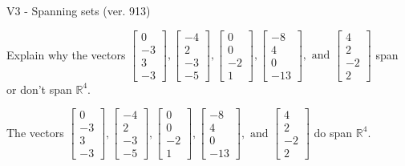 \begin{exercise}
  \begin{exerciseTitle}V3 - Spanning sets (ver. 913)\end{exerciseTitle}
  \begin{exerciseStatement}
    Explain why the vectors \(\left[\begin{array}{r}
0 \\
-3 \\
3 \\
-3
\end{array}\right] , \left[\begin{array}{r}
-4 \\
2 \\
-3 \\
-5
\end{array}\right] , \left[\begin{array}{r}
0 \\
0 \\
-2 \\
1
\end{array}\right] , \left[\begin{array}{r}
-8 \\
4 \\
0 \\
-13
\end{array}\right] , \text{ and } \left[\begin{array}{r}
4 \\
2 \\
-2 \\
2
\end{array}\right]\) span or don't span \(\mathbb{R}^4\). 
	


  \end{exerciseStatement}
  \begin{exerciseAnswer}
   The vectors \(\left[\begin{array}{r}
0 \\
-3 \\
3 \\
-3
\end{array}\right] , \left[\begin{array}{r}
-4 \\
2 \\
-3 \\
-5
\end{array}\right] , \left[\begin{array}{r}
0 \\
0 \\
-2 \\
1
\end{array}\right] , \left[\begin{array}{r}
-8 \\
4 \\
0 \\
-13
\end{array}\right] , \text{ and } \left[\begin{array}{r}
4 \\
2 \\
-2 \\
2
\end{array}\right]\) 
  	 do  
	span \(\mathbb{R}^4\).
  



\end{exerciseAnswer}
\end{exercise}
